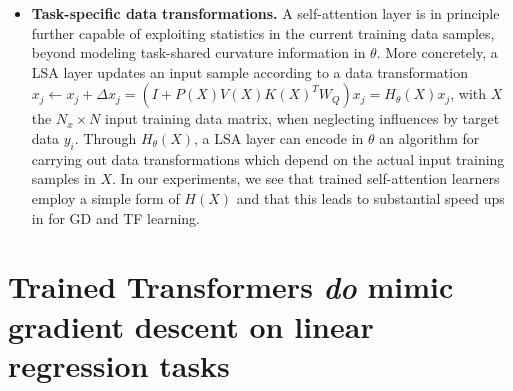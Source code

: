 \documentclass{article}
\theoremstyle{plain}
\theoremstyle{definition}
\theoremstyle{remark}
\begin{document}
\begin{itemize}
\item \textbf{Task-specific data transformations.} A self-attention layer is in principle further capable of exploiting statistics in the current training data samples, beyond modeling  task-shared curvature information in $\theta$. More concretely, a LSA layer updates an input sample according to a data transformation $x_j \leftarrow x_j+ \Delta x_j = (I + P(X)V(X)K(X)^TW_Q)x_j = H_\theta(X) x_j$, with $X$ the $N_x \times N$ input training data matrix, when neglecting influences by target data $y_i$. Through $H_\theta(X)$, a LSA layer can encode in $\theta$ an algorithm for carrying out data transformations which depend on the actual input training samples in $X$. In our experiments, we see that trained self-attention learners employ a simple form of $H(X)$ and that this leads to substantial speed ups in for GD and TF learning.
\end{itemize}

\section{Trained Transformers \textit{do} mimic gradient descent on linear regression tasks}
\label{sect:trained_tf}
\end{document}
